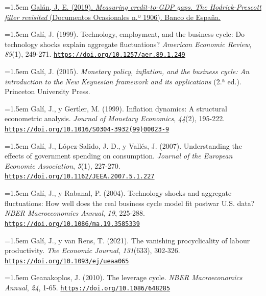 \documentclass[10pt,a4paper]{article}
\begin{document}
\noindent\hangindent=1.5em \href{https://www.bde.es/wbe/es/publicaciones/analisis-economico-investigacion/documentos-ocasionales/measuring-credittogdp-gaps--hodrickprescott-filter-revisited.html}{Galán, J. E. (2019). \textit{Measuring credit-to-GDP gaps. The Hodrick-Prescott filter revisited} (Documentos Ocasionales n.º 1906). Banco de España.}

\noindent\hangindent=1.5em Galí, J. (1999). Technology, employment, and the business cycle: Do technology shocks explain aggregate fluctuations? \textit{American Economic Review}, \textit{89}(1), 249-271. \href{https://doi.org/10.1257/aer.89.1.249}{\nolinkurl{https://doi.org/10.1257/aer.89.1.249}}

\noindent\hangindent=1.5em Galí, J. (2015). \textit{Monetary policy, inflation, and the business cycle: An introduction to the New Keynesian framework and its applications} (2.ª ed.). Princeton University Press.

\noindent\hangindent=1.5em Galí, J., y Gertler, M. (1999). Inflation dynamics: A structural econometric analysis. \textit{Journal of Monetary Economics}, \textit{44}(2), 195-222. \href{https://doi.org/10.1016/S0304-3932(99)00023-9}{\nolinkurl{https://doi.org/10.1016/S0304-3932(99)00023-9}}

\noindent\hangindent=1.5em Galí, J., López-Salido, J. D., y Vallés, J. (2007). Understanding the effects of government spending on consumption. \textit{Journal of the European Economic Association}, \textit{5}(1), 227-270. \href{https://doi.org/10.1162/JEEA.2007.5.1.227}{\nolinkurl{https://doi.org/10.1162/JEEA.2007.5.1.227}}

{\sloppy\noindent\hangindent=1.5em Galí, J., y Rabanal, P. (2004). Technology shocks and aggregate fluctuations: How well does the real business cycle model fit postwar U.S. data? \textit{NBER Macroeconomics Annual}, \textit{19}, 225-288. \href{https://doi.org/10.1086/ma.19.3585339}{\nolinkurl{https://doi.org/10.1086/ma.19.3585339}}\par}

\noindent\hangindent=1.5em Galí, J., y van Rens, T. (2021). The vanishing procyclicality of labour productivity. \textit{The Economic Journal}, \textit{131}(633), 302-326. \href{https://doi.org/10.1093/ej/ueaa065}{\nolinkurl{https://doi.org/10.1093/ej/ueaa065}}

\noindent\hangindent=1.5em Geanakoplos, J. (2010). The leverage cycle. \textit{NBER Macroeconomics Annual}, \textit{24}, 1-65. \href{https://doi.org/10.1086/648285}{\nolinkurl{https://doi.org/10.1086/648285}}
\end{document}
